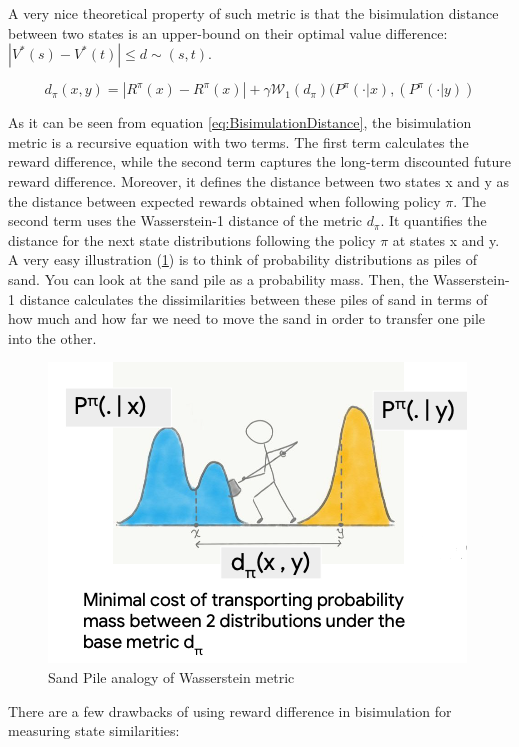 \documentclass{usiinftr}
\begin{document}
A very nice theoretical property of such metric is that the bisimulation distance between two states is an upper-bound on their optimal value difference: $|V^*(s) - V^*(t)| \leq d \sim (s,t)$. 

\begin{equation}\label{eq:BisimulationDistance}
    d_{\pi}(x,y) = |R^{\pi}(x) - R^{\pi}(x)| + \gamma \mathcal{W}_1(d_{\pi}) (P^{\pi}(\cdot | x), (P^{\pi}(\cdot | y)) 
\end{equation}
\cite{castro2020scalable}

As it can be seen from equation \ref{eq:BisimulationDistance}, the bisimulation metric is a recursive equation with two terms. The first term calculates the reward difference, while the second term captures the long-term discounted future reward difference. Moreover, it defines the distance between two states x and y as the distance between expected rewards obtained when following policy $\pi$. The second term uses the Wasserstein-1 distance of the metric $d_{\pi}$. It quantifies the distance for the next state distributions following the policy $\pi$ at states x and y. A very easy illustration (\ref{fig:SandPile}) is to think of probability distributions as piles of sand. You can look at the sand pile as a probability mass. Then, the Wasserstein-1 distance calculates the dissimilarities between these piles of sand in terms of how much and how far we need to move the sand in order to transfer one pile into the other.

\begin{figure}[h]
    \centering
    \includegraphics[width = 0.5\linewidth]{figures/image6.png}
    \caption{Sand Pile analogy of Wasserstein metric \cite{github_contrastive_similarity}}
    \label{fig:SandPile}
\end{figure}

There are a few drawbacks of using reward difference in bisimulation for measuring state similarities:
\end{document}
